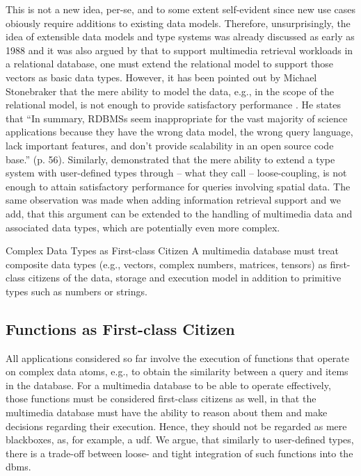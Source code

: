 This is not a new idea, per-se, and to some extent self-evident since new use cases obiously require additions to existing data models. Therefore, unsurprisingly, the idea of extensible data models and type systems was already discussed as early as 1988 \cite{Linnemann:1988Design} and it was also argued by \cite{Giangreco:2018Database} that to support multimedia retrieval workloads in a relational database, one must extend the relational model to support those vectors as basic data types. However, it has been pointed out by Michael Stonebraker that the mere ability to model the data, e.g., in the scope of the relational model, is not enough to provide satisfactory performance \cite{Stonebraker:2013SciDB}. He states that ``In summary, RDBMSs seem inappropriate for the vast majority of science applications because they have the wrong data model, the wrong query language, lack important features, and don't provide scalability in an open source code base.'' \cite{Stonebraker:2013SciDB} (p. 56). Similarly, \cite{Whang:2010Tightly} demonstrated that the mere ability to extend a type system with user-defined types through -- what they call -- loose-coupling, is not enough to attain satisfactory performance for queries involving spatial data. The same observation was made when adding information retrieval support \cite{Whang:2015DB} and we add, that this argument can be extended to the handling of multimedia data and associated data types, which are potentially even more complex.

\begin{requirement}[label=requirement:complex_data_types]{Complex Data Types as First-class Citizen}{}
    A multimedia database must treat composite data types (e.g., vectors, complex numbers, matrices, tensors) as first-class citizens of the data, storage and execution model in addition to primitive types such as numbers or strings.
\end{requirement}

\subsection{Functions as First-class Citizen}

All applications considered so far involve the execution of functions that operate on complex data atoms, e.g., to obtain the similarity between a query and items in the database. For a multimedia database to be able to operate effectively, those functions must be considered first-class citizens as well, in that the multimedia database must have the ability to reason about them and make decisions regarding their execution. Hence, they should not be regarded as mere blackboxes, as, for example, a \acrshort{udf}. We argue, that similarly to user-defined types, there is a trade-off between loose- and tight integration of such functions into the \acrshort{dbms}.


